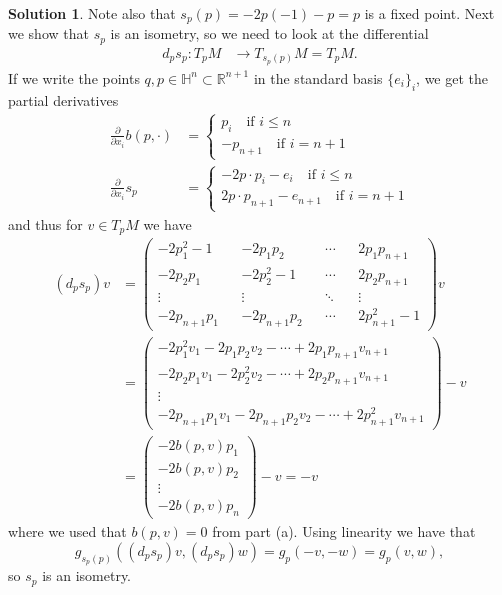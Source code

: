 \documentclass{article}[10pt]
\theoremstyle{definition}
\newtheorem*{solution*}{Solution}
\newcommand{\bbH}{\mathbb{H}}
\newcommand{\bbR}{\mathbb{R}}
\begin{document}
\begin{enumerate}
{\begin{mdframed}
\begin{solution*}
	Note also that $s_p(p)=-2p(-1)-p=p$ is a fixed point.
	Next we show that $s_p$ is an isometry, so we need to look at the differential
	\begin{align*}
	d_p s_p \colon T_pM &\to T_{s_p(p)}M=T_p M .
	\end{align*}
	If we write the points $q,p \in \bbH^n \subset \bbR^{n+1}$ in the standard basis $\{e_i\}_i$, we get the partial derivatives
	\begin{align*}
	\frac{\partial}{\partial x_i} b(p,\cdot ) &=\left\{ \begin{matrix} p_i \quad \text{if } i \leq n \\ -p_{n+1} \quad \text{if } i=n+1 \end{matrix}\right. \\
	\frac{\partial}{\partial x_i} s_p &= \left\{ \begin{matrix} -2p\cdot p_i - e_i \quad \text{if } i \leq n \\ 2p\cdot p_{n+1} - e_{n+1} \quad \text{if } i=n+1 \end{matrix}\right.
	\end{align*}
	and thus for $v \in T_p M$ we have
	\begin{align*}
	(d_ps_p) v &= \left( \begin{matrix}
	-2p_1^2-1 && -2p_1p_2 && \cdots && 2p_1p_{n+1} \\
	-2p_2p_1 && -2p_2^2 -1 && \cdots && 2p_2p_{n+1} \\
	\vdots && \vdots && \ddots && \vdots \\
	-2p_{n+1}p_1 && -2p_{n+1}p_2 && \cdots && 2p_{n+1}^2-1
	\end{matrix} \right) v \\
	&=  \left( \begin{matrix}
	-2p_1^2v_1 -2p_1p_2v_2 - \cdots + 2p_1p_{n+1}v_{n+1} \\
	-2p_2p_1v_1-2p_2^2v_2 - \cdots + 2p_2p_{n+1}v_{n+1} \\
	\vdots  \\
	-2p_{n+1}p_1v_1 -2p_{n+1}p_2v_2 - \cdots + 2p_{n+1}^2v_{n+1}
	\end{matrix} \right)  - v \\
	&=  \left( \begin{matrix}
	-2b(p,v)p_1 \\
	-2b(p,v)p_2 \\
	\vdots  \\
	-2b(p,v)p_n
	\end{matrix} \right)  - v = - v
	\end{align*}
	where we used that $b(p,v)=0$ from part (a). Using linearity we have that
	$$
	g_{s_p(p)}((d_ps_p)v,(d_ps_p)w)=g_p(-v,-w)=g_p(v,w),
	$$
	so $s_p$ is an isometry.
	

\end{solution*}
\end{mdframed}}
\end{enumerate}
\end{document}
